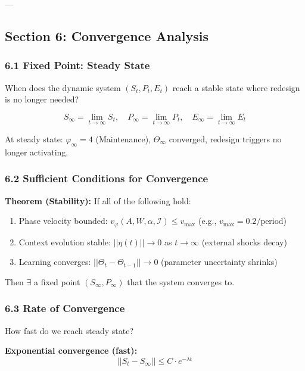 ---

\subsection*{Section 6: Convergence Analysis}
\label{sec:kkk-convergence}

\subsubsection*{6.1 Fixed Point: Steady State}

When does the dynamic system $(S_t, P_t, E_t)$ reach a stable state where redesign is no longer needed?

\begin{equation}
S_\infty = \lim_{t \to \infty} S_t, \quad P_\infty = \lim_{t \to \infty} P_t, \quad E_\infty = \lim_{t \to \infty} E_t
\label{eq:kkk-steady-state}
\end{equation}

At steady state: $\varphi_\infty = 4$ (Maintenance), $\Theta_\infty$ converged, redesign triggers no longer activating.

\subsubsection*{6.2 Sufficient Conditions for Convergence}

\textbf{Theorem (Stability):} If all of the following hold:
\begin{enumerate}
\item Phase velocity bounded: $v_\varphi(A, W, \alpha, \mathcal{I}) \leq v_{\max}$ (e.g., $v_{\max} = 0.2/\text{period}$)
\item Context evolution stable: $||\eta(t)|| \to 0$ as $t \to \infty$ (external shocks decay)
\item Learning converges: $||\Theta_t - \Theta_{t-1}|| \to 0$ (parameter uncertainty shrinks)
\end{enumerate}

Then $\exists$ a fixed point $(S_\infty, P_\infty)$ that the system converges to.

\subsubsection*{6.3 Rate of Convergence}

How fast do we reach steady state?

\textbf{Exponential convergence (fast):}
\begin{equation}
||S_t - S_\infty|| \leq C \cdot e^{-\lambda t}
\label{eq:kkk-exponential}
\end{equation}

